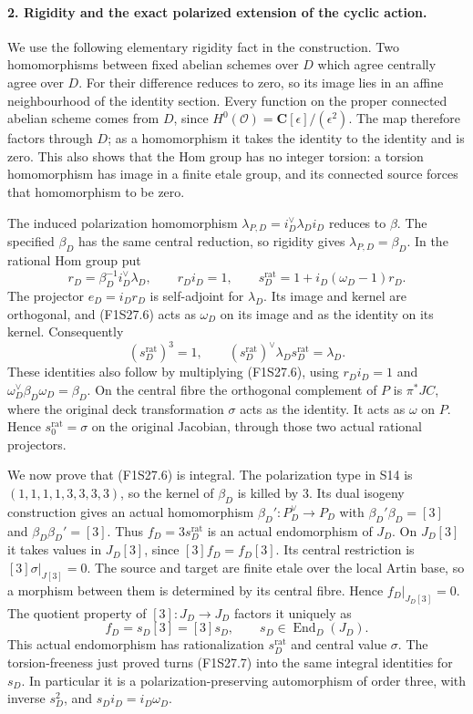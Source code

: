 \paragraph{2. Rigidity and the exact polarized extension of the cyclic action.}
We use the following elementary rigidity fact in the
construction. Two homomorphisms between fixed abelian
schemes over $D$ which agree centrally agree over $D$.
For their difference reduces to zero, so its image lies
in an affine neighbourhood of the identity section.
Every function on the proper connected abelian scheme
comes from $D$, since $H^0(\mathcal O)=\mathbf C[\epsilon]/(\epsilon^2)$.
The map therefore factors through $D$; as a homomorphism
it takes the identity to the identity and is zero.
This also shows that the Hom group has no integer torsion:
a torsion homomorphism has image in a finite etale group,
and its connected source forces that homomorphism to be zero.

The induced polarization homomorphism
$\lambda_{P,D}=i_D^\vee\lambda_Di_D$ reduces to $\beta$.
The specified $\beta_D$ has the same central reduction,
so rigidity gives $\lambda_{P,D}=\beta_D$.
In the rational Hom group put
\[
 r_D=\beta_D^{-1}i_D^\vee\lambda_D,
 \qquad r_Di_D=1,
 \qquad s_D^{\mathrm{rat}}
       =1+i_D(\omega_D-1)r_D.
 \tag{F1S27.6}
\]
The projector $e_D=i_Dr_D$ is self-adjoint for $\lambda_D$.
Its image and kernel are orthogonal, and (F1S27.6) acts
as $\omega_D$ on its image and as the identity on its
kernel. Consequently
\[
 (s_D^{\mathrm{rat}})^3=1,
 \qquad (s_D^{\mathrm{rat}})^\vee\lambda_D
                        s_D^{\mathrm{rat}}=\lambda_D.
 \tag{F1S27.7}
\]
These identities also follow by multiplying (F1S27.6),
using $r_Di_D=1$ and $\omega_D^\vee\beta_D\omega_D=\beta_D$.
On the central fibre the orthogonal complement of $P$
is $\pi^*JC$, where the original deck transformation
$\sigma$ acts as the identity. It acts as $\omega$ on
$P$. Hence $s_0^{\mathrm{rat}}=\sigma$ on the original
Jacobian, through those two actual rational projectors.

We now prove that (F1S27.6) is integral. The polarization
type in S14 is $(1,1,1,1,3,3,3,3)$, so the kernel of
$\beta_D$ is killed by $3$. Its dual isogeny construction
gives an actual homomorphism $\beta_D':P_D^\vee\to P_D$
with $\beta_D'\beta_D=[3]$ and
$\beta_D\beta_D'=[3]$. Thus
$f_D=3s_D^{\mathrm{rat}}$ is an actual endomorphism of $J_D$.
On $J_D[3]$ it takes values in $J_D[3]$, since
$[3]f_D=f_D[3]$. Its central restriction is
$[3]\sigma|_{J[3]}=0$. The source and target are finite
etale over the local Artin base, so a morphism between
them is determined by its central fibre. Hence
$f_D|_{J_D[3]}=0$.
The quotient property of $[3]:J_D\to J_D$ factors it
uniquely as
\[
                 f_D=s_D[3]=[3]s_D,
              \qquad s_D\in\operatorname{End}_D(J_D).
 \tag{F1S27.8}
\]
This actual endomorphism has rationalization
$s_D^{\mathrm{rat}}$ and central value $\sigma$.
The torsion-freeness just proved turns (F1S27.7) into
the same integral identities for $s_D$. In particular
it is a polarization-preserving automorphism of order
three, with inverse $s_D^2$, and
$s_Di_D=i_D\omega_D$.

